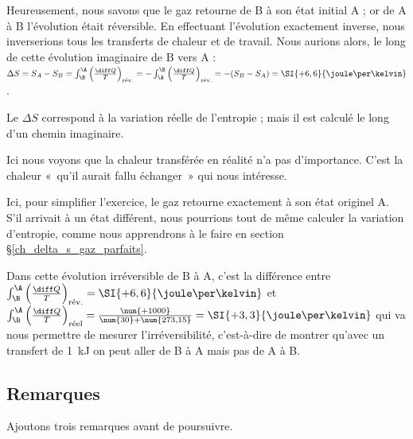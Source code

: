 \begin{anexample}
\begin{answer}
				Heureusement, nous savons que le gaz retourne de B à son état initial A ; or de A à B l’évolution était réversible. En effectuant l’évolution exactement inverse, nous inverserions tous les transferts de chaleur et de travail. Nous aurions alors, le long de cette évolution imaginaire de B vers A : $\Delta S = S_A - S_B 
					= \int_\B^\A \left( \frac{\diff Q}{T} \right)_\text{rév.} 
					= - \int_\A^\B \left( \frac{\diff Q}{T} \right)_\text{rév.}
					= -(S_B - S_A)
					= \SI{+6,6}{\joule\per\kelvin}$. 
						\begin{remark}Le $\Delta S$ correspond à la variation réelle de l’entropie ; mais il est calculé le long d’un chemin imaginaire.\end{remark}
						\begin{remark} Ici nous voyons que la chaleur transférée en réalité n’a pas d’importance. C’est la chaleur «~qu’il aurait fallu échanger~» qui nous intéresse.\end{remark}
						\begin{remark} Ici, pour simplifier l’exercice, le gaz retourne exactement à son état originel A. S’il arrivait à un état différent, nous pourrions tout de même calculer la variation d’entropie, comme nous apprendrons à le faire en section \S\ref{ch_delta_s_gaz_parfaits}.\end{remark}
						\begin{remark}Dans cette évolution irréversible de B à A, c’est la différence entre $\int_\B^\A \left( \frac{\diff Q}{T} \right)_\text{rév.} = \SI{+6,6}{\joule\per\kelvin}$ et $\int_\B^\A \left( \frac{\diff Q}{T} \right)_\text{réel} = \frac{\num{+1000}}{\num{30}+\num{273,15}} =  \SI{+3,3}{\joule\per\kelvin}$ qui va nous permettre de mesurer l’irréversibilité, c’est-à-dire de montrer qu’avec un transfert de \SI{1}{\kilo\joule} on peut aller de B à A mais pas de A à B.\end{remark}
				\end{answer}
		\end{anexample}

		
	\subsection{Remarques}
	
		Ajoutons trois remarques avant de poursuivre.
		
